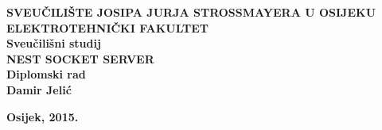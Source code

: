 \newpage
\begin{titlepage}
\begin{center}

\textbf{\MakeUppercase{\large
    Sveučilište Josipa Jurja Strossmayera u Osijeku}}\\[0.2cm]

\textbf{\MakeUppercase{\large Elektrotehnički fakultet}}\\[0.8cm]
\textbf{\large Sveučilišni studij}\\ [5cm]

\textbf{\MakeUppercase{\Large Nest socket server }}\\ [1cm]

\textbf{\large Diplomski rad}\\  [5 cm]

\textbf{\Large Damir Jelić}\\ [0.5cm]

\vfill

\textbf{\large Osijek, 2015.} \\

\end{center}
\end{titlepage}

